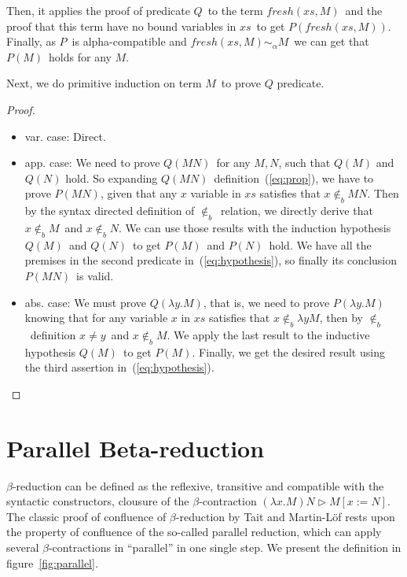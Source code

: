 \documentclass[preprint,10pt]{sigplanconf}
\newcommand{\lam}{\ensuremath{\lambda}}
\newcommand{\alpsym}{\ensuremath{\sim_\alpha}}
\newcommand{\ninb}{\ensuremath{\not\in_b}}
\newcommand{\betar}{\ensuremath{\triangleright}}
\begin{document}
Then, it applies the proof of predicate $Q$\ to the term $fresh(xs,M)$\ and the proof that this term have no bound variables in $xs$\ to get $P(fresh(xs,M))$. Finally, as $P$\ is alpha-compatible and $fresh(xs,M) \alpsym M$\ we can get that $P(M)$\ holds for any $M$.

Next, we do primitive induction on term $M$\ to prove $Q$ predicate.

\begin{proof} \  
  \begin{itemize}
  \item var. case: Direct.
  \item app. case: We need to prove $Q(M N)$\ for any $M,N$, such that $Q(M)$ and $Q(N)$ hold. So expanding $Q(M N)$\ definition~(\ref{eq:prop}), we have to prove $P(M N)$, given that any $x$ variable in $xs$ satisfies that $x \ninb M N$. Then by the syntax directed definition of $\ninb$\ relation, we directly derive that $x \ninb M$\ and $x \ninb N$. We can use those results with the induction hypothesis $Q(M)$\ and $Q(N)$\ to get $P(M)$\ and $P(N)$\ hold. We have all the premises in the second predicate in~(\ref{eq:hypothesis}), so finally its conclusion $P(M N)$\ is valid.
  \item abs. case: We must prove $Q(\lam y . M)$, that is, we need to prove $P(\lam y . M)$ knowing that for any variable $x$ in $xs$ satisfies that $x \ninb \lam y M$, then by $\ninb$\ definition $x \not= y$\ and $x \ninb M$. We apply the last result to the inductive hypothesis $Q(M)$\ to get $P(M)$. Finally, we get the desired result using the third assertion in~(\ref{eq:hypothesis}).
  \end{itemize}
\end{proof}

\section{Parallel Beta-reduction}
\label{sec:parallel}

$\beta$-reduction can be defined as the reflexive, transitive and compatible with the syntactic constructors, clousure of the $\beta$-contraction $(\lam x . M) N \betar M [ x := N ]$. The classic proof of confluence of $\beta$-reduction by Tait and Martin-L\"of rests upon the property of confluence of the so-called parallel reduction, which can apply several $\beta$-contractions in ``parallel'' in one single step.
We present the definition in figure~\ref{fig:parallel}. 
\end{document}
